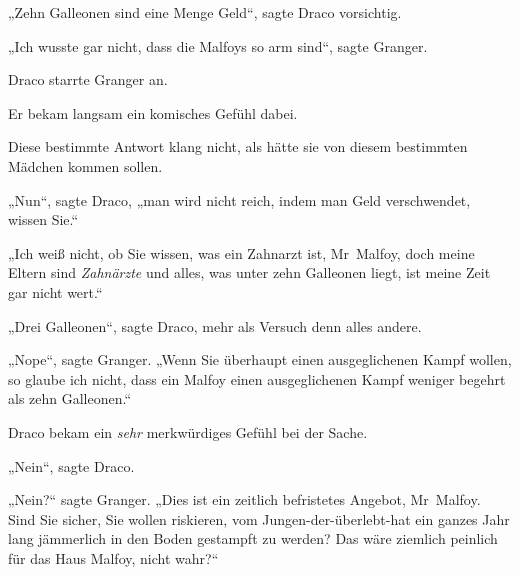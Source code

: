 „Zehn Galleonen sind eine Menge Geld“, sagte Draco vorsichtig.

„Ich wusste gar nicht, dass die Malfoys so arm sind“, sagte Granger.

Draco starrte Granger an.

Er bekam langsam ein komisches Gefühl dabei.

Diese bestimmte Antwort klang nicht, als hätte sie von diesem bestimmten Mädchen kommen sollen.

„Nun“, sagte Draco, „man wird nicht reich, indem man Geld verschwendet, wissen Sie.“

„Ich weiß nicht, ob Sie wissen, was ein Zahnarzt ist, Mr~Malfoy, doch meine Eltern sind \emph{Zahnärzte} und alles, was unter zehn Galleonen liegt, ist meine Zeit gar nicht wert.“

„Drei Galleonen“, sagte Draco, mehr als Versuch denn alles andere.

„Nope“, sagte Granger. „Wenn Sie überhaupt einen ausgeglichenen Kampf wollen, so glaube ich nicht, dass ein Malfoy einen ausgeglichenen Kampf weniger begehrt als zehn Galleonen.“

Draco bekam ein \emph{sehr} merkwürdiges Gefühl bei der Sache.

„Nein“, sagte Draco.

„Nein?“ sagte Granger. „Dies ist ein zeitlich befristetes Angebot, Mr~Malfoy. Sind Sie sicher, Sie wollen riskieren, vom Jungen-der-überlebt-hat ein ganzes Jahr lang jämmerlich in den Boden gestampft zu werden? Das wäre ziemlich peinlich für das Haus Malfoy, nicht wahr?“

